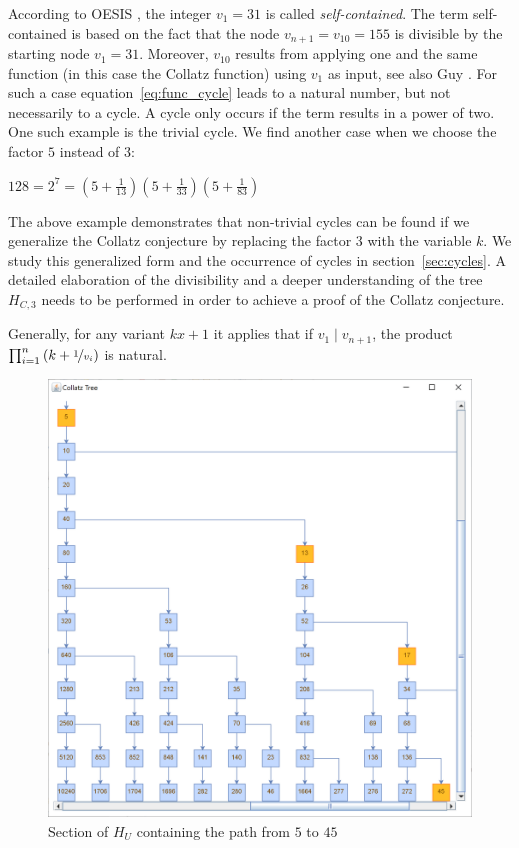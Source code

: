 According to OESIS \cite{Ref_OESIS_A005184}, the integer $v_1=31$ is called \textit{self-contained}. The term self-contained is based on the fact that the node $v_{n+1}=v_{10}=155$ is divisible by the starting node $v_1=31$. Moreover, $v_{10}$ results from applying one and the same function (in this case the Collatz function) using $v_1$ as input, see also Guy \cite[p.~332]{Ref_Guy}. For such a case equation~\ref{eq:func_cycle} leads to a natural number, but not necessarily to a cycle. A cycle only occurs if the term results in a power of two. One such example is the trivial cycle. We find another case when we choose the factor $5$ instead of $3$:
\begin{center}
	$128=2^7=\left(5+\frac{1}{13}\right)\left(5+\frac{1}{33}\right)
	\left(5+\frac{1}{83}\right)$
\end{center}

The above example demonstrates that non-trivial cycles can be found if we generalize the Collatz conjecture by replacing the factor $3$ with the variable $k$. We study this generalized form and the occurrence of cycles in section~\ref{sec:cycles}. A detailed elaboration of the divisibility and a deeper understanding of the tree $H_{C,3}$ needs to be performed in order to achieve a proof of the Collatz conjecture.

Generally, for any variant $kx+1$ it applies that if $v_1\mid v_{n+1}$, the product $\prod_{i=1}^n\left(k+\nicefrac{1}{v_i}\right)$ is natural.

\newpage

\begin{figure}[H]
	\includegraphics[width=1.00\textwidth]{figures/h_u.png}
	\caption{Section of $H_U$ containing the path from $5$ to $45$}
	\label{fig:3}
\end{figure}

